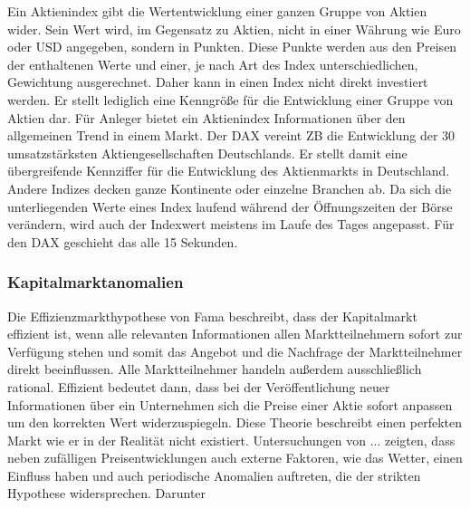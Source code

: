 Ein Aktienindex gibt die Wertentwicklung einer ganzen Gruppe von Aktien wider. Sein Wert wird, im Gegensatz zu Aktien, nicht in einer Währung wie Euro oder \gls{USD} angegeben, sondern in Punkten. Diese Punkte werden aus den Preisen der enthaltenen Werte und einer, je nach Art des Index unterschiedlichen, Gewichtung ausgerechnet. Daher kann in einen Index nicht direkt investiert werden. Er stellt lediglich eine Kenngröße für die Entwicklung einer Gruppe von Aktien dar. Für Anleger bietet ein Aktienindex Informationen über den allgemeinen Trend in einem Markt. Der \gls{DAX} vereint \gls{ZB} die Entwicklung der 30 umsatzstärksten Aktiengesellschaften Deutschlands. Er stellt damit eine übergreifende Kennziffer für die Entwicklung des Aktienmarkts in Deutschland. Andere Indizes decken ganze Kontinente oder einzelne Branchen ab. Da sich die unterliegenden Werte eines Index laufend während der Öffnungszeiten der Börse verändern, wird auch der Indexwert meistens im Laufe des Tages angepasst. Für den \gls{DAX} geschieht das alle 15 Sekunden.

\subsubsection{Kapitalmarktanomalien}



Die Effizienzmarkthypothese von Fama beschreibt, dass der Kapitalmarkt effizient ist, wenn alle relevanten Informationen allen Marktteilnehmern sofort zur Verfügung stehen und somit das Angebot und die Nachfrage der Marktteilnehmer direkt beeinflussen. Alle Marktteilnehmer handeln außerdem ausschließlich rational. Effizient bedeutet dann, dass bei der Veröffentlichung neuer Informationen über ein Unternehmen sich die Preise einer Aktie sofort anpassen um den korrekten Wert widerzuspiegeln. Diese Theorie beschreibt einen perfekten Markt wie er in der Realität nicht existiert. Untersuchungen von ... zeigten, dass neben zufälligen Preisentwicklungen auch externe Faktoren, wie das Wetter, einen Einfluss haben und auch periodische Anomalien auftreten, die der strikten Hypothese widersprechen. Darunter


